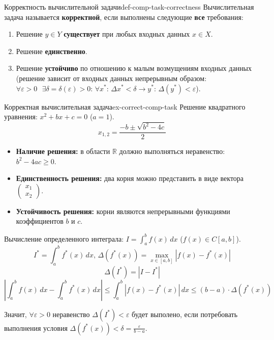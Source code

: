 \documentclass[14pt]{extarticle}
\begin{document}
    \begin{definition}{Корректность вычислительной задачи}{def-comp-task-correctness}
        Вычислительная задача называется \textbf{корректной}, если выполнены следующие \textbf{все} требования: 
        \begin{enumerate}
            \item Решение $y \in Y$ \textbf{существует} при любых входных данных $x \in X$.
            \item Решение \textbf{единственно}.
            \item Решение \textbf{устойчиво} по отношению к малым возмущениям входных данных (решение зависит от входных данных непрерывным образом: $\forall \varepsilon > 0 \text{ } \exists \delta = \delta(\varepsilon) > 0 \text{: } \forall x^{*} \text{: } \Delta{x^{*}} < \delta \rightarrow y^{*} \text{: } \Delta(y^{*}) < \varepsilon$). 
        \end{enumerate}
    \end{definition}

    \begin{example}{Корректная вычислительная задача}{ex-correct-comp-task}
        Решение квадратного уравнения: $x^{2} + bx + c = 0$ ($a = 1$).
        $$x_{1, 2} = \frac{-b \pm \sqrt{b^{2} - 4c}}{2}$$
        \begin{itemize}
            \item \textbf{Наличие решения:} в области $\mathbb{R}$ должно выполняться неравенство: $b^{2} - 4ac \geq 0$.
            \item \textbf{Единственность решения:} два корня можно представить в виде вектора $\begin{pmatrix} x_{1} \\ x_{2} \end{pmatrix}$.
            \item \textbf{Устойчивость решения:} корни являются непрерывными функциями коэффициентов $b$ и $c$.
        \end{itemize}

        \vspace{\baselineskip}

        Вычисление определенного интеграла: $I = \int_{a}^{b} f(x) \, dx$ ($f(x) \in C[a, b]$).\\
        $$I^{*} = \int_{a}^{b} f^{*}(x) \, dx \text{, } \Delta(f^{*}(x)) = \max_{x \in [a, b]}|f(x) - f^{*}(x)|$$
        $$\Delta(I^{*}) = |I - I^{*}|$$ 
        $$|\int_{a}^{b} f(x) \, dx - \int_{a}^{b} f^{*}(x) \, dx| \leq \int_{a}^{b} |f(x) - f^{*}(x)| \, dx \leq (b - a) \cdot \Delta(f^{*}(x))$$

        \vspace{\baselineskip}

        Значит, $\forall \varepsilon > 0$ неравенство $\Delta(I^{*}) < \varepsilon$ будет выполено, если потребовать выполнения условия $\Delta(f^{*}(x)) < \delta = \frac{\varepsilon}{b - a}$.
    \end{example}
\end{document}
